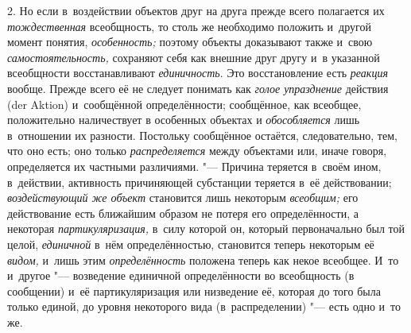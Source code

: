 2. Но если в~воздействии объектов друг на друга прежде всего
полагается их {\em тождественная}
всеобщность, то столь же необходимо положить и~другой момент
понятия, {\em особенность;}
поэтому объекты доказывают также и~свою
{\em самостоятельность,}
сохраняют себя как внешние друг другу и~в указанной
всеобщности восстанавливают
{\em единичность}. Это
восстановление есть {\em реакция}
вообще. Прежде всего её не следует понимать
как {\em голое упразднение}
действия (der Aktion) и~сообщённой
определённости; сообщённое, как всеобщее, положительно наличествует в
особенных объектах и {\em обособляется}
лишь в~отношении их разности. Постольку сообщённое остаётся,
следовательно, тем, что оно есть; оно только
{\em распределяется}
между объектами или, иначе говоря, определяется их частными
различиями. "--- Причина теряется в~своём ином, в~действии,
активность причиняющей субстанции теряется в~её действовании;
{\em воздействующий же объект}
становится лишь некоторым
{\em всеобщим;} его
действование есть ближайшим образом не потеря его определённости, а
некоторая {\em партикуляризация,}
в~силу которой он, который первоначально был той целой,
{\em единичной} в~нём
определённостью, становится теперь некоторым её
{\em видом,} и~лишь этим
{\em определённость}
положена теперь как некое всеобщее. И~то и~другое
"--- возведение единичной определённости во всеобщность (в
сообщении) и~её партикуляризация или низведение её, которая до того была
только единой, до уровня некоторого вида (в~распределении)
"--- есть одно и~то
же.

